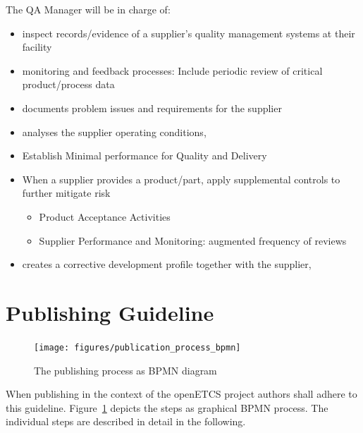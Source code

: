 \documentclass{template/openetcs_article}
\begin{document}
The QA Manager will be in charge of:
\begin{itemize}
\item inspect records/evidence of a supplier’s quality management systems at their facility
\item monitoring and feedback processes: Include periodic review of critical product/process data
\item documents problem issues and requirements for the supplier
\item analyses the supplier operating conditions,
\item Establish Minimal performance for Quality and Delivery
\item When a supplier provides a product/part, apply supplemental controls to further mitigate risk 
\begin{itemize}
\item Product Acceptance Activities
\item Supplier Performance and Monitoring: augmented frequency of reviews
\end{itemize}
\item creates a corrective development profile together with the supplier,
\end{itemize}


\section{Publishing Guideline}
\label{sct:publishingguideline}

\begin{figure}[H]
\texttt{[image: figures/publication\_process\_bpmn]}
\caption{The publishing process as BPMN diagram}
\label{fig:process}
\end{figure}

When publishing in the context of the openETCS project authors shall adhere to this guideline. Figure~\ref{fig:process} depicts the steps as graphical BPMN process. The individual steps are described in detail in the following.
\end{document}

